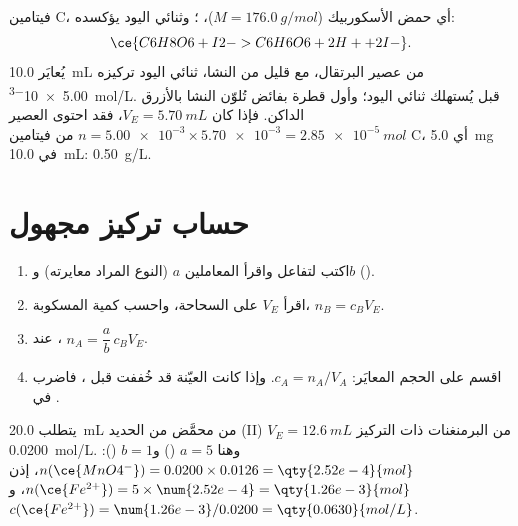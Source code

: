 \begin{example}\label{ex:g11:titration:vitamin-c}
فيتامين C، أي حمض الأسكوربيك  ($M = \qty{176.0}{g/mol}$)،
؛ وثنائي اليود  يؤكسده:
\[
  \ce{C6H8O6 + I2 -> C6H6O6 + 2H+ + 2I-} .
\]
يُعايَر \qty{10.0}{mL} من عصير البرتقال، مع قليل من النشا، 
ثنائي اليود تركيزه \qty{5.00e-3}{mol/L}. قبل  يُستهلك ثنائي
اليود؛ وأول قطرة بفائض تُلوّن النشا بالأزرق الداكن. فإذا كان
$V_E = \qty{5.70}{mL}$، فقد احتوى العصير
$n = \num{5.00e-3} \times \num{5.70e-3} = \qty{2.85e-5}{mol}$ من فيتامين
C، أي \qty{5.0}{mg} في \qty{10.0}{mL}: \qty{0.50}{g/L}.
\end{example}

\section{حساب تركيز مجهول}

\begin{method}\label{met:g11:titration:computing}
\begin{enumerate}
  \item اكتب  لتفاعل  واقرأ
        المعاملين $a$ (النوع المراد معايرته) و$b$ ().
  \item اقرأ $V_E$ على السحاحة، واحسب كمية 
        المسكوبة، $n_B = c_B V_E$.
  \item عند ، $n_A = \dfrac{a}{b}\, c_B V_E$.
  \item اقسم على الحجم المعايَر: $c_A = n_A / V_A$. وإذا كانت العيّنة
        قد خُففت قبل ، فاضرب في .
\end{enumerate}
\end{method}

\begin{example}\label{ex:g11:titration:iron}
يتطلب \qty{20.0}{mL} من  محمَّض من الحديد (II)
$V_E = \qty{12.6}{mL}$ من البرمنغنات ذات التركيز \qty{0.0200}{mol/L}. وهنا
$a = 5$ () و$b = 1$ ():
$n(\ce{MnO4^-}) = 0.0200 \times 0.0126 = \qty{2.52e-4}{mol}$، إذن
$n(\ce{Fe^{2+}}) = 5 \times \num{2.52e-4} = \qty{1.26e-3}{mol}$،
و$c(\ce{Fe^{2+}}) = \num{1.26e-3} / 0.0200 = \qty{0.0630}{mol/L}$.
\end{example}

